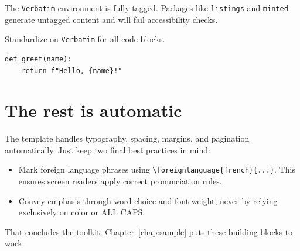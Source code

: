  The \texttt{Verbatim} environment is fully tagged. Packages like \texttt{listings} and \texttt{minted} generate untagged content and will fail accessibility checks.

 Standardize on \texttt{Verbatim} for all code blocks.

\begin{Verbatim}
def greet(name):
    return f"Hello, {name}!"
\end{Verbatim}

\section{The rest is automatic}
\label{sec:text}

The template handles typography, spacing, margins, and pagination automatically. Just keep two final best practices in mind:

\begin{itemize}
  \item Mark foreign language phrases using \verb|\foreignlanguage{french}{...}|. This ensures screen readers apply correct pronunciation rules.
  \item Convey emphasis through word choice and font weight, never by relying exclusively on color or ALL CAPS.
\end{itemize}

\noindent That concludes the toolkit. Chapter~\ref{chap:sample} puts these building blocks to work.